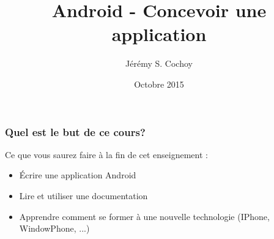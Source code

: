 \documentclass{beamer}
\begin{document}
\title{Android - Concevoir une application}
\author{Jérémy S. Cochoy}
\date{Octobre 2015}


\begin{frame}
\titlepage
\end{frame}

\begin{frame}
\tableofcontents
\end{frame}

\begin{frame}
\frametitle{Quel est le but de ce cours?}

\begin{block}{Ce que vous saurez faire à la fin de cet enseignement :}

	\begin{itemize}
		\item Écrire une application Android
		\item Lire et utiliser une documentation
		\item Apprendre comment se former à une nouvelle technologie (IPhone, WindowPhone, ...)
	\end{itemize}

\end{block}

\end{frame}
\end{document}
